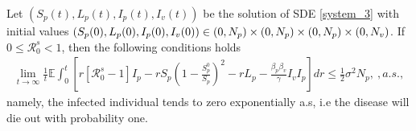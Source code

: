 \begin{theorem}%
	Let 
	$(S_p(t),L_p(t),I_p(t),I_v(t))$ be the solution of SDE \eqref{system_3} 
	with initial values 
	$
		(S_p(0), L_p(0), I_p(0), I_v(0))
		\in 
		(0, N_p) 
		\times
		(0, N_p) 
		\times
		(0, N_p)
		\\
		\times
		(0, N_v)
	$. If $0\leq \mathcal{R}^s_0<1$, then the following conditions holds
	\begin{align*}
		\lim
		\limits_{t\to \infty}
		\frac{1}{t}
		\mathbb{E}
			\int_{0} ^ {t}
			\left[
				r [\mathcal{R} ^ s_0-1] I_p - 
				r S_p
				\left(
					1 - 
					\frac{S^0_p}{S_p}
				\right) ^ 2 - 
				r L_p - 
				\frac{\beta_p\beta_v}{\gamma} 
				I_v I_p
			\right] dr 
			\leq 
			\frac{1}{2}
			\sigma ^ 2 N_p, \ , a.s.,
	\end{align*}
	namely, the infected individual tends to zero exponentially a.s, i.e the 
	disease will die out with probability one.
\end{theorem}
%
